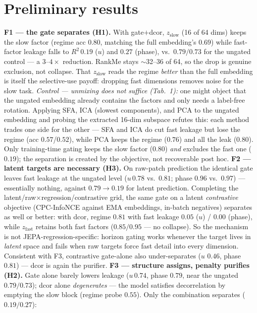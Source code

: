 \documentclass[10pt,twocolumn]{article}
\begin{document}
\section{Preliminary results}
\textbf{F1 --- the gate separates (H1).} With gate$+$dcor, $z_{\mathrm{slow}}$
(16 of 64 dims) keeps the slow factor (regime acc $0.80$, matching the full
embedding's $0.69$) while fast-factor leakage falls to $R^2\,0.19$ ($u$) and
$0.27$ (phase), vs.\ $0.79/0.73$ for the ungated control --- a $3$--$4\times$
reduction. RankMe stays $\sim$32--36 of 64, so the drop is genuine exclusion,
not collapse. That $z_{\mathrm{slow}}$ reads the regime \emph{better} than the
full embedding is itself the selective-use payoff: dropping fast dimensions
removes noise for the slow task.
\emph{Control --- unmixing does not suffice (Tab.~1):} one might object that
the ungated embedding already contains the factors and only needs a label-free
rotation. Applying SFA, ICA (slowest components), and PCA to the ungated
embedding and probing the extracted 16-dim subspace refutes this: each method
trades one side for the other --- SFA and ICA do cut fast leakage but lose the
regime (acc $0.57$/$0.52$), while PCA keeps the regime ($0.76$) and all the
leak ($0.80$). Only training-time gating keeps the slow factor ($0.80$)
\emph{and} excludes the fast one ($0.19$); the separation is created by the
objective, not recoverable post hoc.
\textbf{F2 --- latent targets are necessary (H3).} On raw-patch prediction
the identical gate leaves fast leakage at the ungated level ($u\,0.78$ vs.\
$0.81$; phase $0.96$ vs.\ $0.97$) --- essentially nothing, against
$0.79\!\to\!0.19$ for latent prediction. Completing the
latent/raw$\times$regression/contrastive grid, the same gate on a latent
\emph{contrastive} objective (CPC-InfoNCE against EMA embeddings, in-batch
negatives) separates as well or better: with dcor, regime $0.81$ with fast
leakage $0.05$ ($u$) / $0.00$ (phase), while $z_{\mathrm{fast}}$ retains both
fast factors ($0.85/0.95$ --- no collapse). So the mechanism is not
JEPA-regression-specific: horizon gating works whenever the target lives in
\emph{latent} space and fails when raw targets force fast detail into every
dimension. Consistent with F3, contrastive gate-alone also under-separates
($u$ $0.46$, phase $0.81$) --- dcor is again the purifier.
\textbf{F3 --- structure assigns, penalty purifies (H2).} Gate alone barely
lowers leakage ($u\,0.74$, phase $0.79$, near the ungated $0.79/0.73$); dcor
alone \emph{degenerates} --- the model satisfies decorrelation by emptying the
slow block (regime probe $0.55$). Only the combination separates ($0.19/0.27$):
\end{document}
